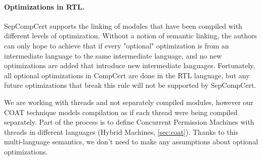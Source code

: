 \paragraph{Optimizations in RTL.} SepCompCert supports the linking of modules that have been compiled with different levels of optimization. Without a notion of semantic linking, the authors can only hope to achieve that if
every "optional" optimization is from an intermediate language to the same intermediate language, and no new optimizations are added that introduce new intermediate languages. Fortunately, all optional optimizations in CompCert are done in the RTL language, but any future optimizations that break this rule will not be supported by SepCompCert. 

We are working with threads and not separately compiled modules, however our COAT technique models compilation as if each thread were being compiled separately. Part of the process is to define Concurrent Permission Machines with threads in different languages (Hybrid Machines, \autoref{sec:coat}). Thanks to this multi-language semantics, we don't need to make any assumptions about optional optimizations. 
